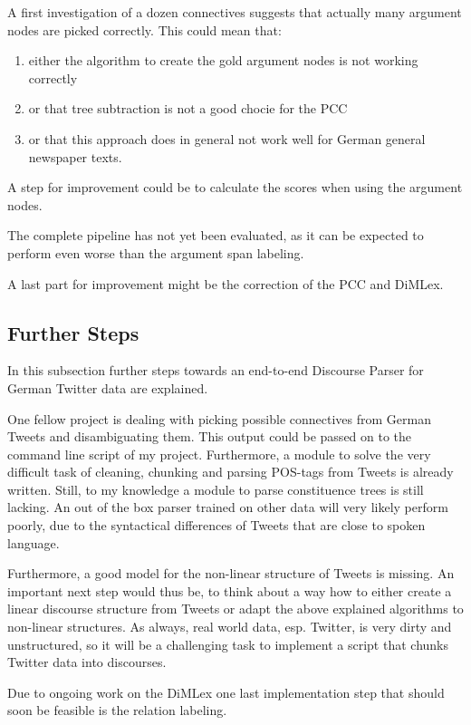 \documentclass[10pt,a4paper]{article}
\begin{document}
A first investigation of a dozen connectives suggests that actually many argument nodes are picked correctly. This could mean that:
\begin{enumerate}
\item either the algorithm to create the gold argument nodes is not working correctly
\item or that tree subtraction is not a good chocie for the PCC
\item or that this approach does in general not work well for German general newspaper texts.
\end{enumerate}
A step for improvement could be to calculate the scores when using the argument nodes.

The complete pipeline has not yet been evaluated, as it can be expected to perform even worse than the argument span labeling.

A last part for improvement might be the correction of the PCC and DiMLex.


\subsection{Further Steps}
In this subsection further steps towards an end-to-end Discourse Parser for German Twitter data are explained.

One fellow project is dealing with picking possible connectives from German Tweets and disambiguating them. This output could be passed on to the command line script of my project. Furthermore, a module to solve the very difficult task of cleaning, chunking and parsing POS-tags from Tweets is already written. Still, to my knowledge a module to parse constituence trees is still lacking. An out of the box parser trained on other data will very likely perform poorly, due to the syntactical differences of Tweets that are close to spoken language.

Furthermore, a good model for the non-linear structure of Tweets is missing. An important next step would thus be, to think about a way how to either create a linear discourse structure from Tweets or adapt the above explained algorithms to non-linear structures. 
As always, real world data, esp. Twitter, is very dirty and unstructured, so it will be a challenging task to implement a script that chunks Twitter data into discourses.

Due to ongoing work on the DiMLex one last implementation step that should soon be feasible is the relation labeling.




\end{document}
